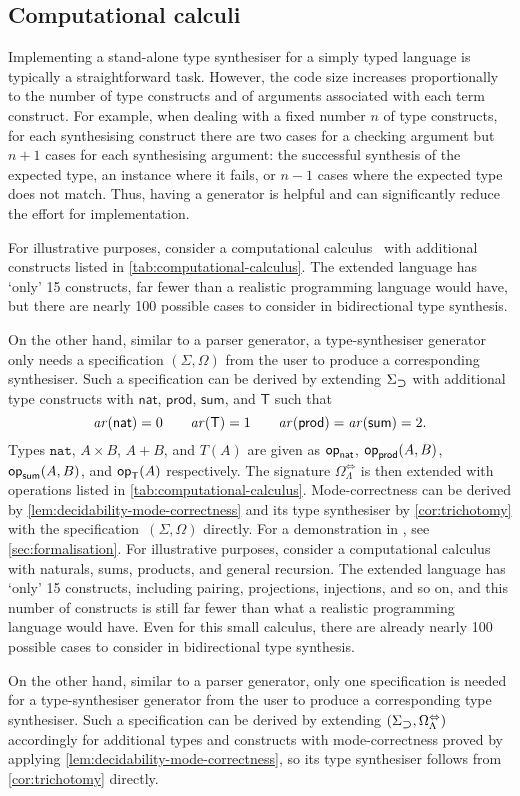 \subsection{Computational calculi}\label{subsec:PCF}
Implementing a stand-alone type synthesiser for a simply typed language is typically a straightforward task.
However, the code size increases proportionally to the number of type constructs and of arguments associated with each term construct.
For example, when dealing with a fixed number $n$ of type constructs, for each synthesising construct there are two cases for a checking argument but $n + 1$ cases for each synthesising argument: the successful synthesis of the expected type, an instance where it fails, or $n-1$ cases where the expected type does not match.
Thus, having a generator is helpful and can significantly reduce the effort for implementation.

\ifarxiv
For illustrative purposes, consider a computational calculus~\cite{Moggi1989} with additional constructs listed in \cref{tab:computational-calculus}.
The extended language has `only' 15 constructs, far fewer than a realistic programming language would have, but there are nearly 100 possible cases to consider in bidirectional type synthesis.

On the other hand, similar to a parser generator, a type-synthesiser generator only needs a specification $(\Sigma, \Omega)$ from the user to produce a corresponding synthesiser. 
Such a specification can be derived by extending $\Sigma_{\mathbin{\bm{\supset}}}$ with additional type constructs with $\mathsf{nat}$, $\mathsf{prod}$, $\mathsf{sum}$, and $\mathsf{T}$ such that
\[
  \mathit{ar}({\mathsf{nat}}) = 0\qquad
  \mathit{ar}({\mathsf{T}}) = 1\qquad
  \mathit{ar}({\mathsf{prod}}) = \mathit{ar}({\mathsf{sum}}) = 2.
\]
Types $\mathtt{nat}$, $A \times B$, $A + B$, and $T(A)$ are given as $\mathsf{op}_{\mathsf{nat}}$, $\mathsf{op}_{\mathsf{prod}}(A, B)$, $\mathsf{op}_{\mathsf{sum}}(A, B)$, and $\mathsf{op}_{\mathsf{T}}(A)$ respectively.
The signature $\Omega_{\Lambda}^{\Leftrightarrow}$ is then extended with operations listed in \cref{tab:computational-calculus}.
Mode-correctness can be derived by \cref{lem:decidability-mode-correctness} and its type synthesiser by \cref{cor:trichotomy} with the specification~$(\Sigma, \Omega)$ directly.
For a demonstration in \Agda, see \cref{sec:formalisation}.
\else
For illustrative purposes, consider a computational calculus~\cite{Moggi1989} with naturals, sums, products, and general recursion.
The extended language has `only' 15 constructs, including pairing, projections, injections, and so on, and this number of constructs is still far fewer than what a realistic programming language would have.
Even for this small calculus, there are already nearly 100 possible cases to consider in bidirectional type synthesis.

On the other hand, similar to a parser generator, only one specification is needed for a type-synthesiser generator from the user to produce a corresponding type synthesiser. 
Such a specification can be derived by extending $(\Sigma_{\mathbin{\bm{\supset}}}, \Omega_{\Lambda}^{\Leftrightarrow})$ accordingly for additional types and constructs with mode-correctness proved by applying \cref{lem:decidability-mode-correctness}, so its type synthesiser follows from \cref{cor:trichotomy} directly.
\fi
